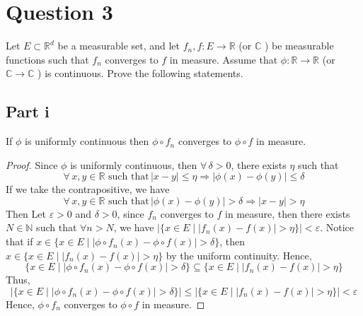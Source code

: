 \section{Question 3}

\begin{question}
   Let $E \subset \mathbb{R}^d$ be a measurable set, and let $f_n, f: E \rightarrow \mathbb{R}$ (or $\mathbb{C}$ ) be measurable functions such that $f_n$ converges to $f$ in measure. Assume that $\phi: \mathbb{R} \rightarrow \mathbb{R}$ (or $\mathbb{C} \rightarrow \mathbb{C}$ ) is continuous. Prove the following statements.
\end{question}

\subsection{Part i}

\begin{question}
    If $\phi$ is uniformly continuous then $\phi \circ f_n$ converges to $\phi \circ f$ in measure.
\end{question}

\begin{answer}
    \begin{proof}
        Since $\phi$ is uniformly continuous, then $\forall\, \delta > 0 $, there exists $\eta$ such that
        \begin{equation}
            \forall\, x,y \in \mathbb{R} \text{ such that}\, \lvert x - y \rvert \leq \eta \Rightarrow \lvert \phi (x) - \phi(y) \rvert \leq \delta
        \end{equation}
        If we take the contrapositive, we have 
        \begin{equation}
            \forall\, x,y \in \mathbb{R} \text{ such that}\, \lvert \phi (x) - \phi(y) \rvert > \delta \Rightarrow \lvert x - y \rvert > \eta 
        \end{equation}
        Then Let $\varepsilon > 0$ and $\delta > 0$, since $f_n$ converges to $f$ in measure, then there exists $N \in \mathbb{N}$ such that $\forall n > N$, we have $\lvert \{x \in E \mid \lvert f_n(x) - f(x) \rvert > \eta\}\rvert < \varepsilon$. Notice that if $x \in \{x \in E \mid \lvert \phi \circ f_n(x) - \phi \circ f(x) \rvert > \delta\}$, then $x \in \{x \in E \mid \lvert f_n(x) - f(x) \rvert > \eta\}$ by the uniform continuity. Hence, 
        \begin{equation}
            \{x \in E \mid \lvert \phi \circ f_n(x) - \phi \circ f(x) \rvert > \delta\} \subseteq \{x \in E \mid \lvert f_n(x) - f(x) \rvert > \eta\}
        \end{equation}
        Thus,
        \begin{equation}
            \lvert \{x \in E \mid \lvert \phi \circ f_n(x) - \phi \circ f(x) \rvert > \delta\}\rvert \leq \lvert\{x \in E \mid \lvert f_n(x) - f(x) \rvert > \eta\}\rvert < \varepsilon
        \end{equation}
        Hence, $\phi\circ f_n$ converges to $\phi \circ f$ in measure.
    \end{proof}
\end{answer}

